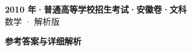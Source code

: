 \documentclass[zihao=-4, a4paper]{ctexart}
\begin{document}
\begin{center}
  {\Large\bfseries 2010 年·普通高等学校招生考试·安徽卷·文科}\\[4pt]
  {\large 数学 · 解析版}
\end{center}
\medskip
{}

\clearpage
{}
\begin{center}{\Large\bfseries 参考答案与详细解析}\end{center}
\medskip

\end{document}
